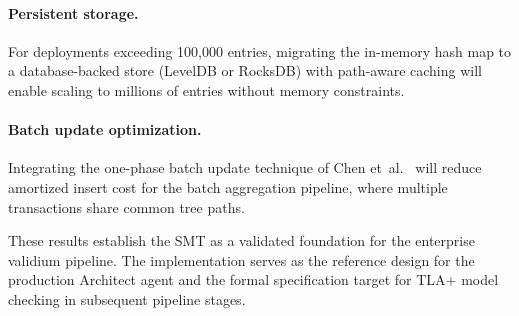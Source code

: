 \paragraph{Persistent storage.} For deployments exceeding 100{,}000 entries, migrating the in-memory hash map to a database-backed store (LevelDB or RocksDB) with path-aware caching will enable scaling to millions of entries without memory constraints.

\paragraph{Batch update optimization.} Integrating the one-phase batch update technique of Chen et~al.~\cite{chen2023batch} will reduce amortized insert cost for the batch aggregation pipeline, where multiple transactions share common tree paths.

These results establish the SMT as a validated foundation for the enterprise validium pipeline. The implementation serves as the reference design for the production Architect agent and the formal specification target for TLA+ model checking in subsequent pipeline stages.
